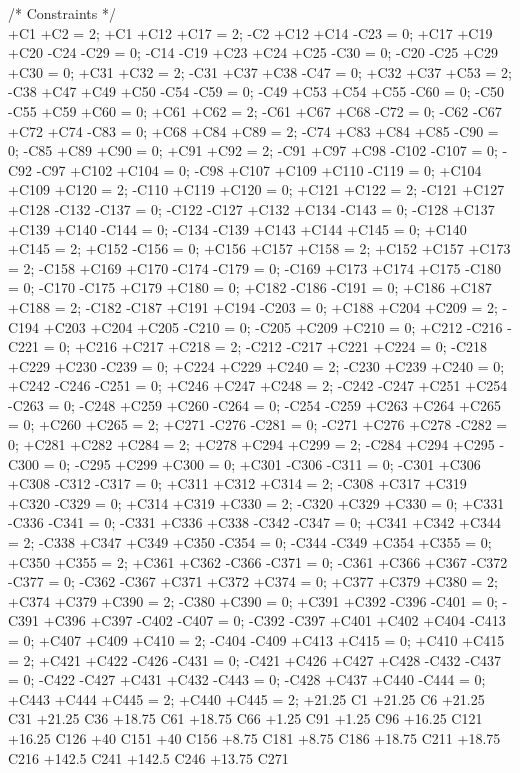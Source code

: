 /* Constraints */ \\
+C1 +C2 = 2;
+C1 +C12 +C17 = 2;
-C2 +C12 +C14 -C23 = 0;
+C17 +C19 +C20 -C24 -C29 = 0;
-C14 -C19 +C23 +C24 +C25 -C30 = 0;
-C20 -C25 +C29 +C30 = 0;
+C31 +C32 = 2;
-C31 +C37 +C38 -C47 = 0;
+C32 +C37 +C53 = 2;
-C38 +C47 +C49 +C50 -C54 -C59 = 0;
-C49 +C53 +C54 +C55 -C60 = 0;
-C50 -C55 +C59 +C60 = 0;
+C61 +C62 = 2;
-C61 +C67 +C68 -C72 = 0;
-C62 -C67 +C72 +C74 -C83 = 0;
+C68 +C84 +C89 = 2;
-C74 +C83 +C84 +C85 -C90 = 0;
-C85 +C89 +C90 = 0;
+C91 +C92 = 2;
-C91 +C97 +C98 -C102 -C107 = 0;
-C92 -C97 +C102 +C104 = 0;
-C98 +C107 +C109 +C110 -C119 = 0;
+C104 +C109 +C120 = 2;
-C110 +C119 +C120 = 0;
+C121 +C122 = 2;
-C121 +C127 +C128 -C132 -C137 = 0;
-C122 -C127 +C132 +C134 -C143 = 0;
-C128 +C137 +C139 +C140 -C144 = 0;
-C134 -C139 +C143 +C144 +C145 = 0;
+C140 +C145 = 2;
+C152 -C156 = 0;
+C156 +C157 +C158 = 2;
+C152 +C157 +C173 = 2;
-C158 +C169 +C170 -C174 -C179 = 0;
-C169 +C173 +C174 +C175 -C180 = 0;
-C170 -C175 +C179 +C180 = 0;
+C182 -C186 -C191 = 0;
+C186 +C187 +C188 = 2;
-C182 -C187 +C191 +C194 -C203 = 0;
+C188 +C204 +C209 = 2;
-C194 +C203 +C204 +C205 -C210 = 0;
-C205 +C209 +C210 = 0;
+C212 -C216 -C221 = 0;
+C216 +C217 +C218 = 2;
-C212 -C217 +C221 +C224 = 0;
-C218 +C229 +C230 -C239 = 0;
+C224 +C229 +C240 = 2;
-C230 +C239 +C240 = 0;
+C242 -C246 -C251 = 0;
+C246 +C247 +C248 = 2;
-C242 -C247 +C251 +C254 -C263 = 0;
-C248 +C259 +C260 -C264 = 0;
-C254 -C259 +C263 +C264 +C265 = 0;
+C260 +C265 = 2;
+C271 -C276 -C281 = 0;
-C271 +C276 +C278 -C282 = 0;
+C281 +C282 +C284 = 2;
+C278 +C294 +C299 = 2;
-C284 +C294 +C295 -C300 = 0;
-C295 +C299 +C300 = 0;
+C301 -C306 -C311 = 0;
-C301 +C306 +C308 -C312 -C317 = 0;
+C311 +C312 +C314 = 2;
-C308 +C317 +C319 +C320 -C329 = 0;
+C314 +C319 +C330 = 2;
-C320 +C329 +C330 = 0;
+C331 -C336 -C341 = 0;
-C331 +C336 +C338 -C342 -C347 = 0;
+C341 +C342 +C344 = 2;
-C338 +C347 +C349 +C350 -C354 = 0;
-C344 -C349 +C354 +C355 = 0;
+C350 +C355 = 2;
+C361 +C362 -C366 -C371 = 0;
-C361 +C366 +C367 -C372 -C377 = 0;
-C362 -C367 +C371 +C372 +C374 = 0;
+C377 +C379 +C380 = 2;
+C374 +C379 +C390 = 2;
-C380 +C390 = 0;
+C391 +C392 -C396 -C401 = 0;
-C391 +C396 +C397 -C402 -C407 = 0;
-C392 -C397 +C401 +C402 +C404 -C413 = 0;
+C407 +C409 +C410 = 2;
-C404 -C409 +C413 +C415 = 0;
+C410 +C415 = 2;
+C421 +C422 -C426 -C431 = 0;
-C421 +C426 +C427 +C428 -C432 -C437 = 0;
-C422 -C427 +C431 +C432 -C443 = 0;
-C428 +C437 +C440 -C444 = 0;
+C443 +C444 +C445 = 2;
+C440 +C445 = 2;
+21.25 C1 +21.25 C6 +21.25 C31 +21.25 C36 +18.75 C61 +18.75 C66 +1.25 C91 +1.25 C96 +16.25 C121 +16.25 C126
 +40 C151 +40 C156 +8.75 C181 +8.75 C186 +18.75 C211 +18.75 C216 +142.5 C241 +142.5 C246 +13.75 C271

